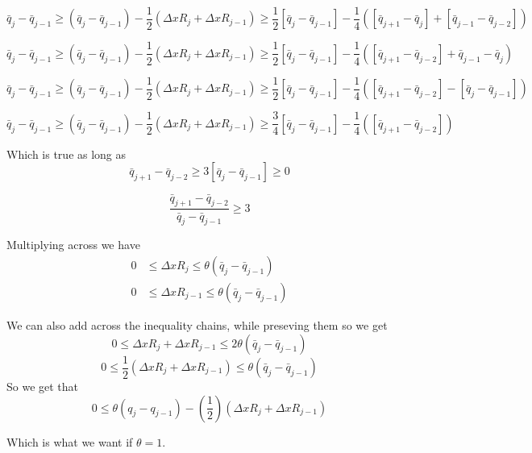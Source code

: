 \documentclass[10pt]{article}
\begin{document}
\[\bar{q}_j - \bar{q}_{j-1} \ge \left(\bar{q}_j - \bar{q}_{j-1}\right) -\frac{1}{2}\left(\Delta x R_j + \Delta x R_{j-1}\right) \ge  \frac{1}{2}\left[\bar{q}_{j} - \bar{q}_{j-1}\right] -\frac{1}{4}\left(\left[\bar{q}_{j+1} - \bar{q}_{j}\right] +  \left[\bar{q}_{j-1} - \bar{q}_{j-2}\right]\right)    \]

\[\bar{q}_j - \bar{q}_{j-1} \ge \left(\bar{q}_j - \bar{q}_{j-1}\right) -\frac{1}{2}\left(\Delta x R_j + \Delta x R_{j-1}\right) \ge  \frac{1}{2}\left[\bar{q}_{j} - \bar{q}_{j-1}\right] -\frac{1}{4}\left(\left[\bar{q}_{j+1} -\bar{q}_{j-2} \right] + \bar{q}_{j-1} -\bar{q}_{j}  \right)    \]

\[\bar{q}_j - \bar{q}_{j-1} \ge \left(\bar{q}_j - \bar{q}_{j-1}\right) -\frac{1}{2}\left(\Delta x R_j + \Delta x R_{j-1}\right) \ge  \frac{1}{2}\left[\bar{q}_{j} - \bar{q}_{j-1}\right] -\frac{1}{4}\left(\left[\bar{q}_{j+1} -\bar{q}_{j-2} \right] - \left[\bar{q}_{j} - \bar{q}_{j-1} \right] \right)    \]

\[\bar{q}_j - \bar{q}_{j-1} \ge \left(\bar{q}_j - \bar{q}_{j-1}\right) -\frac{1}{2}\left(\Delta x R_j + \Delta x R_{j-1}\right) \ge  \frac{3}{4}\left[\bar{q}_{j} - \bar{q}_{j-1}\right] -\frac{1}{4}\left(\left[\bar{q}_{j+1} -\bar{q}_{j-2} \right] \right)    \]

Which is true as long as 
\[\bar{q}_{j+1} -\bar{q}_{j-2} \ge 3 \left[\bar{q}_{j} - \bar{q}_{j-1}\right] \ge 0 \]

\[\dfrac{\bar{q}_{j+1} -\bar{q}_{j-2}}{\bar{q}_{j} - \bar{q}_{j-1}} \ge 3\]

%
%

Multiplying across we have
\begin{align*}
0 &\le \Delta x R_j \le  \theta\left(\bar{q}_{j} - \bar{q}_{j-1}\right)  \\
0 &\le \Delta x R_{j-1} \le \theta\left(\bar{q}_{j} - \bar{q}_{j-1}\right)
\end{align*}

We can also add across the inequality chains, while preseving them so we get
\[0 \le \Delta x R_j +  \Delta x R_{j-1} \le 2 \theta \left(\bar{q}_{j} - \bar{q}_{j-1}\right) \]
\[0 \le \frac{1}{2} \left( \Delta x R_j +  \Delta x R_{j-1}\right) \le \theta \left(\bar{q}_{j} - \bar{q}_{j-1}\right) \]
So we get that
\[0 \le \theta \left(q_{j} - q_{j-1}\right) - \left(\frac{1}{2}\right)\left(\Delta x  R_j + \Delta x R_{j-1}\right) \]

Which is what we want if $\theta = 1$.  
\end{document}
